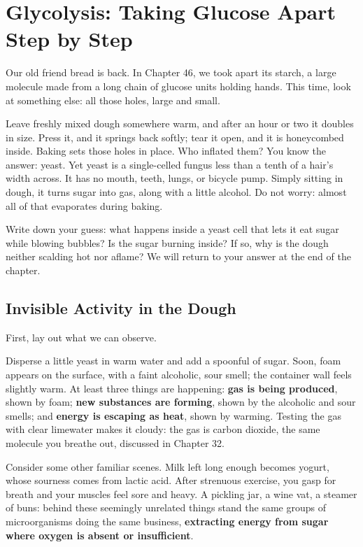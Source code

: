 \chapter{Glycolysis: Taking Glucose Apart Step by Step}

\begin{kaichang}
Our old friend bread is back. In Chapter 46, we took apart its starch, a large molecule made from a long chain of glucose units holding hands. This time, look at something else: all those holes, large and small.

Leave freshly mixed dough somewhere warm, and after an hour or two it doubles in size. Press it, and it springs back softly; tear it open, and it is honeycombed inside. Baking sets those holes in place. Who inflated them? You know the answer: yeast. Yet yeast is a single-celled fungus less than a tenth of a hair's width across. It has no mouth, teeth, lungs, or bicycle pump. Simply sitting in dough, it turns sugar into gas, along with a little alcohol. Do not worry: almost all of that evaporates during baking.

Write down your guess: what happens inside a yeast cell that lets it eat sugar while blowing bubbles? Is the sugar burning inside? If so, why is the dough neither scalding hot nor aflame? We will return to your answer at the end of the chapter.
\end{kaichang}

\section{Invisible Activity in the Dough}

First, lay out what we can observe.

Disperse a little yeast in warm water and add a spoonful of sugar. Soon, foam appears on the surface, with a faint alcoholic, sour smell; the container wall feels slightly warm. At least three things are happening: \textbf{gas is being produced}, shown by foam; \textbf{new substances are forming}, shown by the alcoholic and sour smells; and \textbf{energy is escaping as heat}, shown by warming. Testing the gas with clear limewater makes it cloudy: the gas is carbon dioxide, the same molecule you breathe out, discussed in Chapter 32.

Consider some other familiar scenes. Milk left long enough becomes yogurt, whose sourness comes from lactic acid. After strenuous exercise, you gasp for breath and your muscles feel sore and heavy. A pickling jar, a wine vat, a steamer of buns: behind these seemingly unrelated things stand the same groups of microorganisms doing the same business, \textbf{extracting energy from sugar where oxygen is absent or insufficient}.

